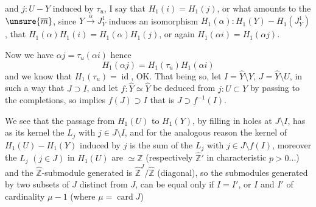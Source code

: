and $j:U-Y$ induced by $\tau_u$, I say that $H_1(i)=H_1(j)$, or what amounts to the $\unsure{\overline m}$, since $Y\xrightarrow{\alpha}J_Y^1$ induces an isomorphism $H_1(\alpha):H_1(Y)-H_1(J_Y^1)$, that $H_1(\alpha)H_1(i)=H_1(\alpha)H_1(j)$, or again $H_1(\alpha i)=H_1(\alpha j)$.

Now we have $\alpha j=\tau_u(\alpha i)$ hence 
\[
H_1(\alpha j)=H_1(\tau_u)H_1(\alpha i)
\]
and we know that $H_1(\tau_u)=\operatorname{id}$, OK. That being so, let $I=\widehat Y\setminus Y$, $J=\widehat Y\setminus U$, in such a way that $J\supset I$, and let $f:\widehat Y\simeq\widehat Y$ be deduced from $j:U\subset Y$ by passing to the completions, so   implies $f(J)\supset I$ that is $J\supset f^{-1}(I)$.

We see that the passage from $H_1(U)$ to $H_1(Y)$, by filling in holes at $J\setminus I$, has as its kernel the  $L_j$ with $j\in J\setminus I$, and for the analogous reason the kernel of $H_1(U)-H_1(Y)$ induced by $j$ is the sum of the $L_j$ with $j\in J\setminus f(I)$, moreover the $L_j$ $(j\in J)$ in $H_1(U)$ are $\simeq\widehat{\mathbb Z}$ (respectively $\widehat{\mathbb Z}'$ in characteristic $p>0$...) and the $\widehat{\mathbb Z}$-submodule generated is $\widehat{\mathbb Z}^{J}/\widehat{\mathbb Z}$ (diagonal), so  the submodules generated by two subsets  of $J$ distinct from $J$, can be equal only if $I=I'$, or $I$ and $I'$ of cardinality $\mu-1$ (where $\mu=\operatorname{card}J$)
